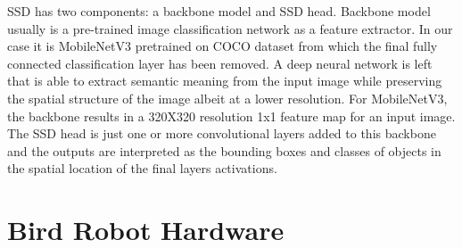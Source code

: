 \documentclass[runningheads]{llncs}
\begin{document}
SSD has two components: a backbone model and SSD head. Backbone model usually is a pre-trained image classification network as a feature extractor. In our case it is MobileNetV3 pretrained on  COCO dataset  from which the final fully connected classification layer has been removed. A deep neural network is left that is able to extract semantic meaning from the input image while preserving the spatial structure of the image albeit at a lower resolution. For MobileNetV3, the backbone results in a 320X320 resolution 1x1 feature map for an input image. The SSD head is just one or more convolutional layers added to this backbone and the outputs are interpreted as the bounding boxes and classes of objects in the spatial location of the final layers activations.\cite {ref_url2}


\section{Bird Robot Hardware}
\end{document}
